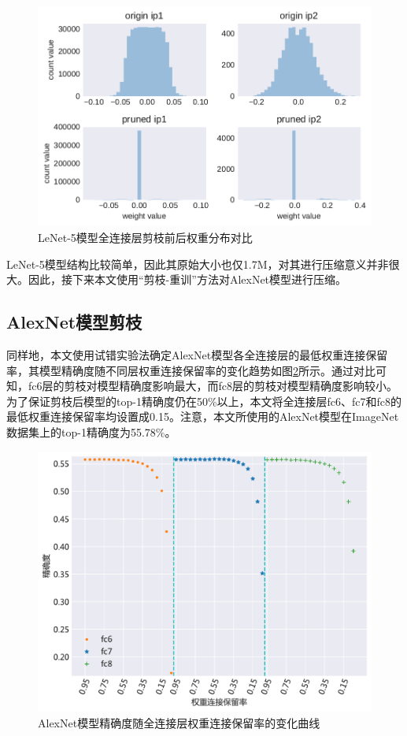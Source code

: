 \begin{figure}[htbp]
    \centering
    \includegraphics[height=0.45\textwidth]{figures/lenet_pruned_weights.pdf}
    \caption{LeNet-5模型全连接层剪枝前后权重分布对比}\label{figure:figure22}
\end{figure}

LeNet-5模型结构比较简单，因此其原始大小也仅1.7M，对其进行压缩意义并非很大。因此，接下来本文使用“剪枝-重训”方法对AlexNet模型进行压缩。


\subsection{AlexNet模型剪枝}

同样地，本文使用试错实验法确定AlexNet模型各全连接层的最低权重连接保留率，其模型精确度随不同层权重连接保留率的变化趋势如图\ref{figure:figure23}所示。通过对比可知，fc6层的剪枝对模型精确度影响最大，而fc8层的剪枝对模型精确度影响较小。为了保证剪枝后模型的top-1精确度仍在50\%以上，本文将全连接层fc6、fc7和fc8的最低权重连接保留率均设置成0.15。注意，本文所使用的AlexNet模型在ImageNet\cite{imagenet.org}数据集上的top-1精确度为55.78\%。

\begin{figure}[htbp]
    \centering
    \includegraphics[height=0.45\textwidth]{figures/alexnet_pruned_threshold.pdf}
    \caption{AlexNet模型精确度随全连接层权重连接保留率的变化曲线}\label{figure:figure23}
\end{figure}

